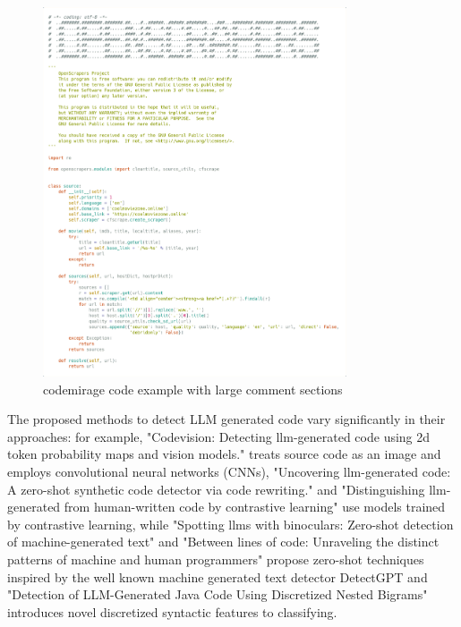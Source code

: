 \begin{figure}[H]
    \centering
    \includegraphics[width=0.8\textwidth]{img/CodeMirage/code example2.png}
    \caption{codemirage code example with large comment sections}
    \label{fig:codemirage example}
\end{figure}

The proposed methods to detect LLM generated code
vary significantly in their approaches: for example, 
"Codevision: Detecting llm-generated code using 2d token probability 
maps and vision models."\cite{xu2025codevision} treats 
source code as an image and employs convolutional neural networks (CNNs), 
"Uncovering llm-generated code: A zero-shot synthetic code detector via code rewriting."
\cite{ye2025uncovering} and 
"Distinguishing llm-generated from human-written code by contrastive learning" 
\cite{xu2025distinguishing} use models trained by contrastive learning, 
while "Spotting llms with binoculars: Zero-shot detection of machine-generated text" 
\cite{hans2024spotting}
and "Between lines of code: Unraveling the distinct patterns of machine and human programmers" 
\cite{shi2024between} propose zero-shot techniques inspired 
by the well known machine generated text detector DetectGPT\cite{mitchell2023detectgpt} 
and "Detection of LLM-Generated Java Code Using Discretized Nested Bigrams" \cite{paek2024detection}
introduces novel 
discretized syntactic features to classifying.

